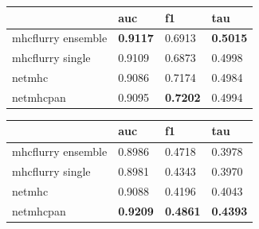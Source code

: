 \begin{tabular}{llll}
\toprule
{} &              auc &               f1 &              tau \\
\midrule
mhcflurry ensemble &  \textbf{0.9117} &           0.6913 &  \textbf{0.5015} \\
mhcflurry single   &           0.9109 &           0.6873 &           0.4998 \\
netmhc             &           0.9086 &           0.7174 &           0.4984 \\
netmhcpan          &           0.9095 &  \textbf{0.7202} &           0.4994 \\
\bottomrule
\end{tabular}

\begin{tabular}{llll}
\toprule
{} &              auc &               f1 &              tau \\
\midrule
mhcflurry ensemble &           0.8986 &           0.4718 &           0.3978 \\
mhcflurry single   &           0.8981 &           0.4343 &           0.3970 \\
netmhc             &           0.9088 &           0.4196 &           0.4043 \\
netmhcpan          &  \textbf{0.9209} &  \textbf{0.4861} &  \textbf{0.4393} \\
\bottomrule
\end{tabular}

